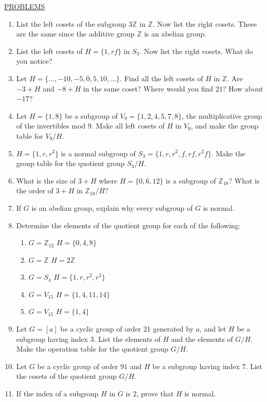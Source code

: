 \documentclass[12pt]{book}
\theoremstyle{definition}
\def\Z{\mathbb{Z}}
\begin{document}
\clearpage

\underline{PROBLEMS}

\begin{enumerate}
\item
List the left cosets of the subgroup $3\Z$ in $\Z$. Now list the right cosets. These are the same since the additive group $\Z$ is an abelian group.

\item
List the left cosets of $H =\{1,rf\}$ in $S_3$. Now list the right cosets. What do you notice?
\item
Let $H = \{...,-10, -5,0,5,10,...\}$. Find all the left cosets of $H$ in $\Z$. Are $-3 + H$ and $-8+H$ in the same coset? Where would you find $21$? How about $-17$?
\item
Let $H = \{1,8\}$ be a subgroup of $V_9 =\{1,2,4,5,7,8\}$, the multiplicative group of the invertibles mod $9$. Make all left cosets of $H$ in $V_9$, and make the group table for $V_9/H$.
\item
$H=\{1,r,r^2\}$ is a normal subgroup of $S_3 =\{1,r,r^2,f,rf,r^2f\}$. Make the group table for the quotient group $S_3/H$.
\item
What is the size of $3 + H$ where $H=\{0,6,12\}$ is a subgroup of $\Z_{18}$? What is the order of $3 + H$ in $\Z_{18}/H$?
\item
If $G$ is an abelian group, explain why every subgroup of $G$ is normal.
\item
Determine the elements of the quotient group  for each of the following:
\begin{enumerate}
\item
$G = \Z_{12}$    $H = \{0,4,8\}$
\item
$G = \Z$            $H = 2\Z$
\item
$G = S_4$         $H = \{1,r,r^2,r^3\}$
\item
$G = V_{15}$       $H = \{1,4,11,14\}$
\item
$G = V_{15}$         $H = \{1,4\}$
\end{enumerate}
\item
Let $G = [a]$ be a cyclic group of order $21$ generated by $a$, and let $H$ be a subgroup having index $3$.  List the elements of $H$ and the elements of $G/H$. Make the operation table for the quotient group $G/H$.
\item
Let $G$ be a cyclic group of order $91$ and $H$ be a subgroup having index $7$. List the cosets of the quotient group $G/H$.
\item
If the index of a subgroup $H$ in $G$ is $2$, prove that $H$ is normal.

\end{enumerate}
\end{document}
